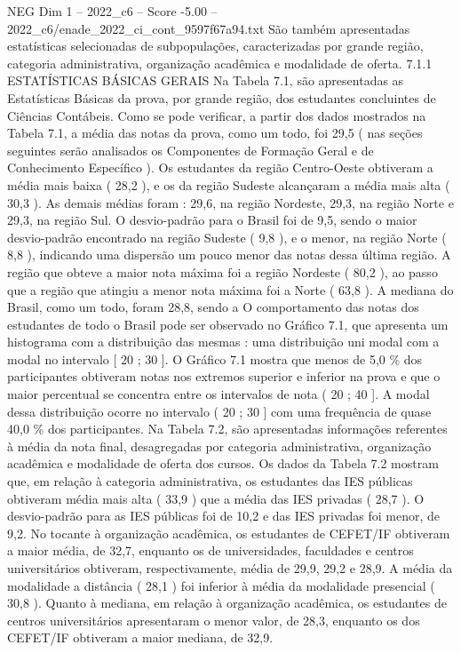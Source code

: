 \begin{textsample}{NEG Dim 1 – 2022\_c6 – Score -5.00 – 2022\_c6/enade\_2022\_ci\_cont\_9597f67a94.txt}
São também apresentadas estatísticas selecionadas de subpopulações, caracterizadas por grande região, categoria administrativa, organização acadêmica e modalidade de oferta. 7.1.1 ESTATÍSTICAS BÁSICAS GERAIS Na Tabela 7.1, são apresentadas as Estatísticas Básicas da prova, por grande região, dos estudantes concluintes de Ciências Contábeis.
Como se pode verificar, a partir dos dados mostrados na Tabela 7.1, a média das notas da prova, como um todo, foi 29,5 ( nas seções seguintes serão analisados os Componentes de Formação Geral e de Conhecimento Específico ).
Os estudantes da região Centro-Oeste obtiveram a média mais baixa ( 28,2 ), e os da região Sudeste alcançaram a média mais alta ( 30,3 ).
As demais médias foram : 29,6, na região Nordeste, 29,3, na região Norte e 29,3, na região Sul.
O desvio-padrão para o Brasil foi de 9,5, sendo o maior desvio-padrão encontrado na região Sudeste ( 9,8 ), e o menor, na região Norte ( 8,8 ), indicando uma dispersão um pouco menor das notas dessa última região.
A região que obteve a maior nota máxima foi a região Nordeste ( 80,2 ), ao passo que a região que atingiu a menor nota máxima foi a Norte ( 63,8 ).
A mediana do Brasil, como um todo, foram 28,8, sendo a O comportamento das notas dos estudantes de todo o Brasil pode ser observado no Gráfico 7.1, que apresenta um histograma com a distribuição das mesmas : uma distribuição uni modal com a modal no intervalo [ 20 ; 30 ].
O Gráfico 7.1 mostra que menos de 5,0 \% dos participantes obtiveram notas nos extremos superior e inferior na prova e que o maior percentual se concentra entre os intervalos de nota ( 20 ; 40 ].
A modal dessa distribuição ocorre no intervalo ( 20 ; 30 ] com uma frequência de quase 40,0 \% dos participantes.
Na Tabela 7.2, são apresentadas informações referentes à média da nota final, desagregadas por categoria administrativa, organização acadêmica e modalidade de oferta dos cursos.
Os dados da Tabela 7.2 mostram que, em relação à categoria administrativa, os estudantes das IES públicas obtiveram média mais alta ( 33,9 ) que a média das IES privadas ( 28,7 ).
O desvio-padrão para as IES públicas foi de 10,2 e das IES privadas foi menor, de 9,2.
No tocante à organização acadêmica, os estudantes de CEFET/IF obtiveram a maior média, de 32,7, enquanto os de universidades, faculdades e centros universitários obtiveram, respectivamente, média de 29,9, 29,2 e 28,9.
A média da modalidade a distância ( 28,1 ) foi inferior à média da modalidade presencial ( 30,8 ).
Quanto à mediana, em relação à organização acadêmica, os estudantes de centros universitários apresentaram o menor valor, de 28,3, enquanto os dos CEFET/IF obtiveram a maior mediana, de 32,9.

\end{textsample}
